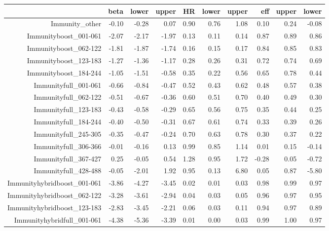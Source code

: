 \begin{table}[ht]
\centering
\begin{tabular}{rrrrrrrrrr}
  \hline
 & beta & lower & upper & HR & lower & upper & eff & upper & lower \\ 
  \hline
Immunity\_other & -0.10 & -0.28 & 0.07 & 0.90 & 0.76 & 1.08 & 0.10 & 0.24 & -0.08 \\ 
  Immunityboost\_001-061 & -2.07 & -2.17 & -1.97 & 0.13 & 0.11 & 0.14 & 0.87 & 0.89 & 0.86 \\ 
  Immunityboost\_062-122 & -1.81 & -1.87 & -1.74 & 0.16 & 0.15 & 0.17 & 0.84 & 0.85 & 0.83 \\ 
  Immunityboost\_123-183 & -1.27 & -1.36 & -1.17 & 0.28 & 0.26 & 0.31 & 0.72 & 0.74 & 0.69 \\ 
  Immunityboost\_184-244 & -1.05 & -1.51 & -0.58 & 0.35 & 0.22 & 0.56 & 0.65 & 0.78 & 0.44 \\ 
  Immunityfull\_001-061 & -0.66 & -0.84 & -0.47 & 0.52 & 0.43 & 0.62 & 0.48 & 0.57 & 0.38 \\ 
  Immunityfull\_062-122 & -0.51 & -0.67 & -0.36 & 0.60 & 0.51 & 0.70 & 0.40 & 0.49 & 0.30 \\ 
  Immunityfull\_123-183 & -0.43 & -0.58 & -0.29 & 0.65 & 0.56 & 0.75 & 0.35 & 0.44 & 0.25 \\ 
  Immunityfull\_184-244 & -0.40 & -0.50 & -0.31 & 0.67 & 0.61 & 0.74 & 0.33 & 0.39 & 0.26 \\ 
  Immunityfull\_245-305 & -0.35 & -0.47 & -0.24 & 0.70 & 0.63 & 0.78 & 0.30 & 0.37 & 0.22 \\ 
  Immunityfull\_306-366 & -0.01 & -0.16 & 0.13 & 0.99 & 0.85 & 1.14 & 0.01 & 0.15 & -0.14 \\ 
  Immunityfull\_367-427 & 0.25 & -0.05 & 0.54 & 1.28 & 0.95 & 1.72 & -0.28 & 0.05 & -0.72 \\ 
  Immunityfull\_428-488 & -0.05 & -2.01 & 1.92 & 0.95 & 0.13 & 6.80 & 0.05 & 0.87 & -5.80 \\ 
  Immunityhybridboost\_001-061 & -3.86 & -4.27 & -3.45 & 0.02 & 0.01 & 0.03 & 0.98 & 0.99 & 0.97 \\ 
  Immunityhybridboost\_062-122 & -3.28 & -3.61 & -2.94 & 0.04 & 0.03 & 0.05 & 0.96 & 0.97 & 0.95 \\ 
  Immunityhybridboost\_123-183 & -2.83 & -3.45 & -2.21 & 0.06 & 0.03 & 0.11 & 0.94 & 0.97 & 0.89 \\ 
  Immunityhybridfull\_001-061 & -4.38 & -5.36 & -3.39 & 0.01 & 0.00 & 0.03 & 0.99 & 1.00 & 0.97 \\ 

\end{tabular}
\end{table}

